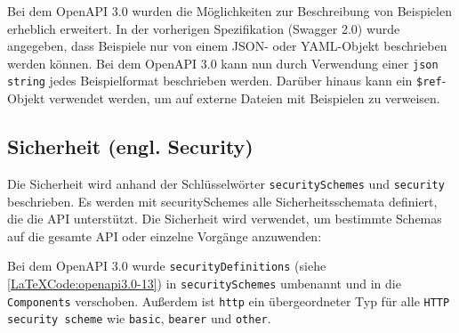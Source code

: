 Bei dem OpenAPI 3.0 wurden die Möglichkeiten zur Beschreibung von Beispielen erheblich erweitert. In der vorherigen Spezifikation (Swagger 2.0) wurde angegeben, dass Beispiele nur von einem JSON- oder YAML-Objekt beschrieben werden können. Bei dem OpenAPI 3.0 kann nun durch Verwendung einer \texttt{json string} jedes Beispielformat beschrieben werden. Darüber hinaus kann ein \texttt{\$ref}-Objekt verwendet werden, um auf externe Dateien mit Beispielen zu verweisen.

\subsection{Sicherheit (engl. Security)}

Die Sicherheit wird anhand der Schlüsselwörter \texttt{securitySchemes} und \texttt{security} beschrieben. Es werden mit securitySchemes alle Sicherheitsschemata definiert, die die API unterstützt. Die Sicherheit wird verwendet, um bestimmte Schemas auf die gesamte API oder einzelne Vorgänge anzuwenden\cite{openapisecurity17}: 

\begin{LaTeXCode}[caption={OpenAPI 3.0 - Security},captionpos=b, label=LaTeXCode:openapi3.0-13][numbers=none]
{
	"components": {
		"securitySchemes": {
			"UserSecurity": {
				"type": "https",
				"scheme": "basic"
			},
			"APIKey": {
				"type": "https",
				"scheme": "bearer",
				"bearerFormat": "TOKEN"
			}
\end{LaTeXCode}

Bei dem OpenAPI 3.0 wurde \texttt{securityDefinitions} (siehe \ref{LaTeXCode:openapi3.0-13}) in \texttt{securitySchemes} umbenannt und in die \texttt{Components} verschoben. Außerdem ist \texttt{http} ein übergeordneter Typ für alle \texttt{HTTP security scheme} wie \texttt{basic}, \texttt{bearer} und \texttt{other}.






















